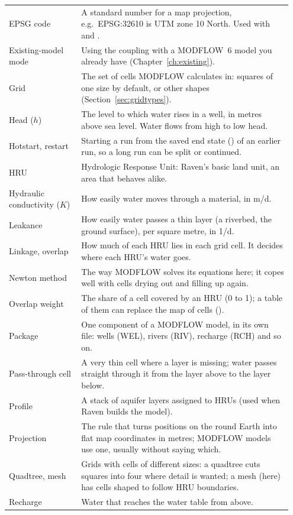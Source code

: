 \begin{longtable}{P{0.24\linewidth}P{0.708\linewidth}}
EPSG code & A standard number for a map projection, e.g.\ EPSG:32610 is UTM zone 10 North. Used with  and .\\
Existing-model mode & Using the coupling with a MODFLOW~6 model you already have (Chapter~\ref{ch:existing}).\\
Grid & The set of cells MODFLOW calculates in: squares of one size by default, or other shapes (Section~\ref{sec:gridtypes}).\\
Head ($h$) & The level to which water rises in a well, in metres above sea level. Water flows from high to low head.\\
Hotstart, restart & Starting a run from the saved end state () of an earlier run, so a long run can be split or continued.\\
HRU & Hydrologic Response Unit: Raven's basic land unit, an area that behaves alike.\\
Hydraulic conductivity ($K$) & How easily water moves through a material, in m/d.\\
Leakance & How easily water passes a thin layer (a riverbed, the ground surface), per square metre, in 1/d.\\
Linkage, overlap & How much of each HRU lies in each grid cell. It decides where each HRU's water goes.\\
Newton method & The way MODFLOW solves its equations here; it copes well with cells drying out and filling up again.\\
Overlap weight & The share of a cell covered by an HRU (0 to 1); a table of them can replace the map of cells ().\\
Package & One component of a MODFLOW model, in its own file: wells (WEL), rivers (RIV), recharge (RCH) and so on.\\
Pass-through cell & A very thin cell where a layer is missing; water passes straight through it from the layer above to the layer below.\\
Profile & A stack of aquifer layers assigned to HRUs (used when Raven builds the model).\\
Projection & The rule that turns positions on the round Earth into flat map coordinates in metres; MODFLOW models use one, usually without saying which.\\
Quadtree, mesh & Grids with cells of different sizes: a quadtree cuts squares into four where detail is wanted; a mesh (here) has cells shaped to follow HRU boundaries.\\
Recharge & Water that reaches the water table from above.\\

\end{longtable}
